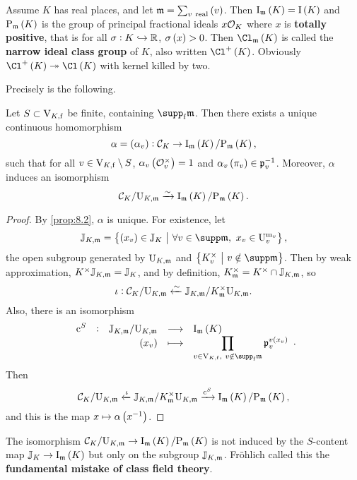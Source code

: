 \begin{example*}
Assume $ K $ has real places, and let $ \mmm = \sum_{v \ \text{real}} \br{v} $. Then $ \I_\mmm\br{K} = \I\br{K} $ and $ \P_\mmm\br{K} $ is the group of principal fractional ideals $ x\mathcal{O}_K $ where $ x $ is \textbf{totally positive}, that is for all $ \sigma : K \hookrightarrow \mathbb{R} $, $ \sigma\br{x} > 0 $. Then $ \Cl_\mmm\br{K} $ is called the \textbf{narrow ideal class group} of $ K $, also written $ \Cl^+\br{K} $. Obviously $ \Cl^+\br{K} \twoheadrightarrow \Cl\br{K} $ with kernel killed by two.
\end{example*}

Precisely is the following.

\begin{theorem}
Let $ S \subset \mathrm{V}_{K, \mathrm{f}} $ be finite, containing $ \supp_\f \mmm $. Then there exists a unique continuous homomorphism
$$ \alpha = \br{\alpha_v} : \CCC_K \to \I_\mmm\br{K} / \P_\mmm\br{K}, $$
such that for all $ v \in \mathrm{V}_{K, \mathrm{f}} \setminus S $, $ \alpha_v\br{\OOO_v^\times} = 1 $ and $ \alpha_v\br{\pi_v} \in \ppp_v^{-1} $. Moreover, $ \alpha $ induces an isomorphism
$$ \CCC_K / \U_{K, \mmm} \xrightarrow{\sim} \I_\mmm\br{K} / \P_\mmm\br{K}. $$
\end{theorem}

\pagebreak

\begin{proof}
By \ref{prop:8.2}, $ \alpha $ is unique. For existence, let
$$ \JJ_{K, \mmm} = \cbr{\br{x_v} \in \JJ_K \st \forall v \in \supp \mmm, \ x_v \in \U_v^{\m_v}}, $$
the open subgroup generated by $ \mathrm{U}_{K, \mathfrak{m}} $ and $ \cbr{K_v^\times \st v \notin \supp \mmm} $. Then by weak approximation, $ K^\times\mathbb{J}_{K, \mathfrak{m}} = \mathbb{J}_K $, and by definition, $ K_{\mathfrak{m}}^\times = K^\times \cap \mathbb{J}_{K, \mathfrak{m}} $, so
$$ \iota : \mathcal{C}_K / \mathrm{U}_{K, \mathfrak{m}} \xleftarrow{\sim} \mathbb{J}_{K, \mathfrak{m}} / K_{\mathfrak{m}}^\times\mathrm{U}_{K, \mathfrak{m}}. $$
Also, there is an isomorphism
$$ \function[\c^S]{\JJ_{K, \mmm} / \U_{K, \mmm}}{\I_\mmm\br{K}}{\br{x_v}}{\prod_{v \in \V_{K, \f}, \ v \notin \supp_\f \mmm} \ppp_v^{v\br{x_v}}}. $$
Then
$$ \CCC_K / \U_{K, \mmm} \xleftarrow{\iota} \JJ_{K, \mmm} / K_\mmm^\times\U_{K, \mmm} \xrightarrow{\c^S} \I_\mmm\br{K} / \P_\mmm\br{K}, $$
and this is the map $ x \mapsto \alpha\br{x^{-1}} $.
\end{proof}

\begin{remark*}
The isomorphism $ \CCC_K / \U_{K, \mmm} \to \I_\mmm\br{K} / \P_\mmm\br{K} $ is not induced by the $ S $-content map $ \JJ_K \to \I_\mmm\br{K} $ but only on the subgroup $ \mathbb{J}_{K, \mathfrak{m}} $. Fr\"ohlich called this the \textbf{fundamental mistake of class field theory}.
\end{remark*}

